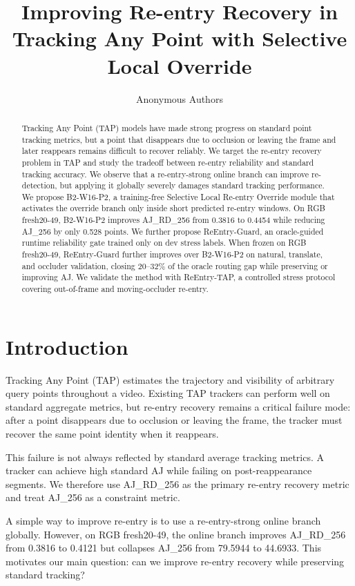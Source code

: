 \documentclass[10pt,twocolumn]{article}
\title{Improving Re-entry Recovery in Tracking Any Point with Selective Local Override}
\author{Anonymous Authors}
\date{}
\begin{document}
\maketitle

\begin{abstract}
Tracking Any Point (TAP) models have made strong progress on standard point tracking metrics, but a point that disappears due to occlusion or leaving the frame and later reappears remains difficult to recover reliably. We target the re-entry recovery problem in TAP and study the tradeoff between re-entry reliability and standard tracking accuracy. We observe that a re-entry-strong online branch can improve re-detection, but applying it globally severely damages standard tracking performance. We propose B2-W16-P2, a training-free Selective Local Re-entry Override module that activates the override branch only inside short predicted re-entry windows. On RGB fresh20-49, B2-W16-P2 improves AJ\_RD\_256 from 0.3816 to 0.4454 while reducing AJ\_256 by only 0.528 points. We further propose ReEntry-Guard, an oracle-guided runtime reliability gate trained only on dev stress labels. When frozen on RGB fresh20-49, ReEntry-Guard further improves over B2-W16-P2 on natural, translate, and occluder validation, closing 20--32\% of the oracle routing gap while preserving or improving AJ. We validate the method with ReEntry-TAP, a controlled stress protocol covering out-of-frame and moving-occluder re-entry.
\end{abstract}

\section{Introduction}

Tracking Any Point (TAP) estimates the trajectory and visibility of arbitrary query points throughout a video. Existing TAP trackers can perform well on standard aggregate metrics, but re-entry recovery remains a critical failure mode: after a point disappears due to occlusion or leaving the frame, the tracker must recover the same point identity when it reappears.

This failure is not always reflected by standard average tracking metrics. A tracker can achieve high standard AJ while failing on post-reappearance segments. We therefore use AJ\_RD\_256 as the primary re-entry recovery metric and treat AJ\_256 as a constraint metric.

A simple way to improve re-entry is to use a re-entry-strong online branch globally. However, on RGB fresh20-49, the online branch improves AJ\_RD\_256 from 0.3816 to 0.4121 but collapses AJ\_256 from 79.5944 to 44.6933. This motivates our main question: can we improve re-entry recovery while preserving standard tracking?
\end{document}
